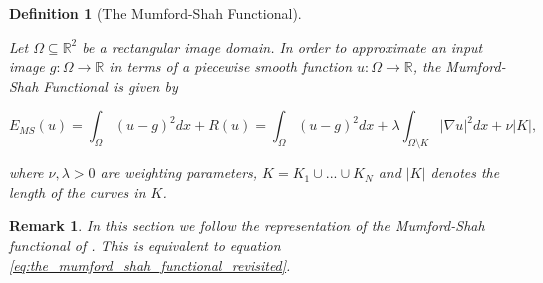 \documentclass{scrreprt}
\newtheorem{definition}[theorem]{Definition}
\newtheorem{remark}[theorem]{Remark}
\begin{document}
        \begin{definition}[The Mumford-Shah Functional] %
        \label{def:the_mumford_shah_functional}

            Let $\Omega \subseteq \mathbb{R}^{2}$ be a rectangular image domain. In order to approximate an input image $g: \Omega \longrightarrow \mathbb{R}$ in terms of a piecewise smooth function $u: \Omega \longrightarrow \mathbb{R}$, the Mumford-Shah Functional is given by
                    
                    \begin{equation}
                        E_{MS}(u) = \int_{\Omega} (u - g)^{2} dx + R(u) = \int_{\Omega} (u - g)^{2} dx + \lambda \int_{\Omega \setminus K} |\nabla u|^{2} dx + \nu |K|,
                    \end{equation}
                    \label{eq:the_mumford_shah_functional}
                
                where $\nu, \lambda > 0$ are weighting parameters, $K = K_{1} \cup ... \cup K_{N}$ and $|K|$ denotes the length of the curves in $K$.

        \end{definition}

        \begin{remark}
            In this section we follow the representation of the Mumford-Shah functional of \cite{Strekalovskiy-Cremers-eccv14}. This is equivalent to equation \ref{eq:the_mumford_shah_functional_revisited}.
        \end{remark}
\end{document}
